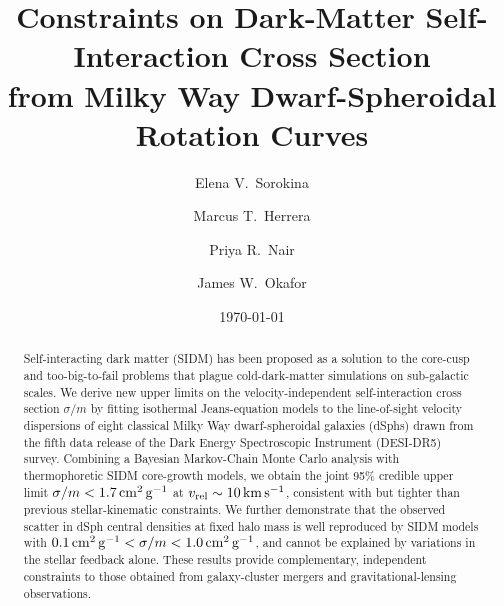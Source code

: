 \documentclass[aps,prd,twocolumn,superscriptaddress,nofootinbib]{revtex4-2}
\begin{document}
\title{Constraints on Dark-Matter Self-Interaction Cross Section\\
       from Milky Way Dwarf-Spheroidal Rotation Curves}

\author{Elena V.~Sorokina}

\author{Marcus T.~Herrera}

\author{Priya R.~Nair}

\author{James W.~Okafor}

\date{\today}

\begin{abstract}
Self-interacting dark matter (SIDM) has been proposed as a solution to the
core-cusp and too-big-to-fail problems that plague cold-dark-matter simulations
on sub-galactic scales.
We derive new upper limits on the velocity-independent self-interaction cross
section $\sigma/m$ by fitting isothermal Jeans-equation models to the
line-of-sight velocity dispersions of eight classical Milky Way
dwarf-spheroidal galaxies (dSphs) drawn from the fifth data release of the
Dark Energy Spectroscopic Instrument (DESI-DR5) survey.
Combining a Bayesian Markov-Chain Monte Carlo analysis with thermophoretic
SIDM core-growth models, we obtain the joint 95\% credible upper limit
$\sigma/m < 1.7\,\mathrm{cm^{2}\,g^{-1}}$ at $v_{\rm rel}\sim 10\,\mathrm{km\,s^{-1}}$,
consistent with but tighter than previous stellar-kinematic constraints.
We further demonstrate that the observed scatter in dSph central densities
at fixed halo mass is well reproduced by SIDM models with
$0.1\,\mathrm{cm^{2}\,g^{-1}} < \sigma/m < 1.0\,\mathrm{cm^{2}\,g^{-1}}$,
and cannot be explained by variations in the stellar feedback alone.
These results provide complementary, independent constraints to those obtained
from galaxy-cluster mergers and gravitational-lensing observations.
\end{abstract}


\maketitle







\end{document}
